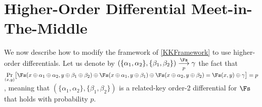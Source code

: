 \section{Higher-Order Differential Meet-in-The-Middle}
\label{NewFramework}

We now describe how to modify the framework of \autoref{KKFramework} to use higher-order differentials.
Let us denote by 
$(\{\alpha_1,\alpha_2\}, \{\beta_1,\beta_2\}) \overset{\Fs}{\underset{p}{\longrightarrow}} \gamma$
the fact that
  $\underset{(x,y)}{\Pr}\big[\Fs(x \oplus \alpha_1 \oplus \alpha_2, y \oplus \beta_1 \oplus \beta_2) \oplus
  \Fs(x \oplus \alpha_1, y \oplus \beta_1) \oplus  \Fs(x \oplus \alpha_2 , y \oplus \beta_2) =
  \Fs(x,y )\oplus \gamma \big] = p$
, meaning
that $(\{\alpha_1,\alpha_2\}, \{\beta_1,\beta_2\})$ is a related-key order-2 differential for $\Fs$ that holds with probability $p$.

